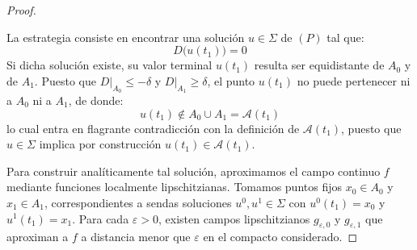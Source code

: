 \begin{proof}
\begin{center}
    \end{center}

    La estrategia consiste en encontrar una solución $u \in \Sigma$ de $(P)$ tal que:
    \[
        D\bigl(u(t_1)\bigr) = 0
    \]
    Si dicha solución existe, su valor terminal $u(t_1)$ resulta ser equidistante de $A_0$ y de $A_1$. Puesto que $D\big|_{A_0} \leq -\delta$ y $D\big|_{A_1} \geq \delta$, el punto $u(t_1)$ no puede pertenecer ni a $A_0$ ni a $A_1$, de donde:
    \[
        u(t_1) \notin A_0 \cup A_1 = \mathcal{A}(t_1)
    \]
    lo cual entra en flagrante contradicción con la definición de $\mathcal{A}(t_1)$, puesto que $u \in \Sigma$ implica por construcción $u(t_1) \in \mathcal{A}(t_1)$.

    Para construir analíticamente tal solución, aproximamos el campo continuo $f$ mediante funciones localmente lipschitzianas. Tomamos puntos fijos $x_0 \in A_0$ y $x_1 \in A_1$, correspondientes a sendas soluciones $u^0, u^1 \in \Sigma$ con $u^0(t_1) = x_0$ y $u^1(t_1) = x_1$. Para cada $\varepsilon > 0$, existen campos lipschitzianos $g_{\varepsilon, 0}$ y $g_{\varepsilon, 1}$ que aproximan a $f$ a distancia menor que $\varepsilon$ en el compacto considerado.
    

\end{proof}
